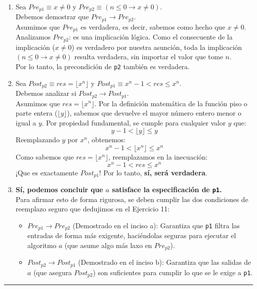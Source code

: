 \begin{enumerate}[label=\textbf{\alph*)}]
    \item Sea $Pre_{p1} \equiv x \neq 0$ y $Pre_{p2} \equiv (n \leq 0 \rightarrow x \neq 0)$. \\
    Debemos demostrar que $Pre_{p1} \rightarrow Pre_{p2}$. \\
    Asumimos que $Pre_{p1}$ es verdadera, es decir, sabemos como hecho que $x \neq 0$. \\
    Analizamos $Pre_{p2}$: es una implicación lógica. Como el consecuente de la implicación ($x \neq 0$) es verdadero por nuestra asunción, toda la implicación $(n \leq 0 \rightarrow x \neq 0)$ resulta verdadera, sin importar el valor que tome $n$. \\
    Por lo tanto, la precondición de \texttt{p2} también es verdadera.
    
    \vspace{0.4cm}
    \item Sea $Post_{p2} \equiv res = \lfloor x^n \rfloor$ y $Post_{p1} \equiv x^n - 1 < res \leq x^n$. \\
    Debemos analizar si $Post_{p2} \rightarrow Post_{p1}$. \\
    Asumimos que $res = \lfloor x^n \rfloor$. Por la definición matemática de la función piso o parte entera ($\lfloor y \rfloor$), sabemos que devuelve el mayor número entero menor o igual a $y$. Por propiedad fundamental, se cumple para cualquier valor $y$ que: 
    $$y - 1 < \lfloor y \rfloor \leq y$$
    Reemplazando $y$ por $x^n$, obtenemos:
    $$x^n - 1 < \lfloor x^n \rfloor \leq x^n$$
    Como sabemos que $res = \lfloor x^n \rfloor$, reemplazamos en la inecuación:
    $$x^n - 1 < res \leq x^n$$
    ¡Que es exactamente $Post_{p1}$! Por lo tanto, \textbf{sí, será verdadera}.

    \vspace{0.4cm}
    \item \textbf{Sí, podemos concluir que $a$ satisface la especificación de \texttt{p1}.} \\
    Para afirmar esto de forma rigurosa, se deben cumplir las dos condiciones de reemplazo seguro que dedujimos en el Ejercicio 11:
    \begin{itemize}
        \item $Pre_{p1} \rightarrow Pre_{p2}$ (Demostrado en el inciso a): Garantiza que \texttt{p1} filtra las entradas de forma más exigente, haciéndolas seguras para ejecutar el algoritmo $a$ (que asume algo más laxo en $Pre_{p2}$).
        \item $Post_{p2} \rightarrow Post_{p1}$ (Demostrado en el inciso b): Garantiza que las salidas de $a$ (que asegura $Post_{p2}$) son suficientes para cumplir lo que se le exige a \texttt{p1}.
    \end{itemize}
\end{enumerate}

\vspace{0.5cm}
\hrule
\vspace{0.5cm}